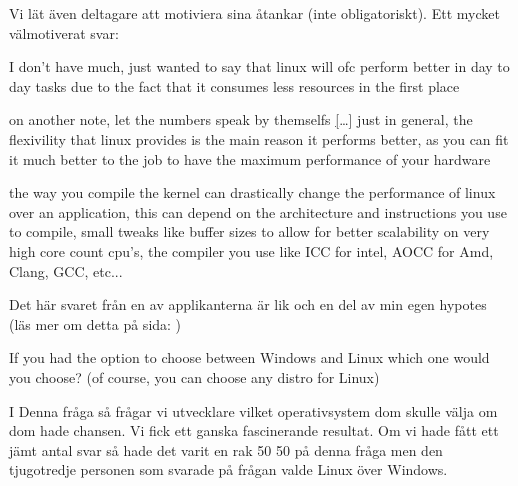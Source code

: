 \documentclass[12pt, a4paper]{report}
\begin{document}
    \vspace{.5cm}
    Vi lät även deltagare att motiviera sina åtankar (inte obligatoriskt). Ett mycket välmotiverat svar: \begin{displayquote}I don't have much, just wanted to say that linux will ofc perform better in day to day tasks due to the fact that it consumes less resources in the first place

    on another note, let the numbers speak by themselfs \hyperlink{https://www.phoronix.com/scan.php?page=article&item=win10-debian101-intel} [\dots] just in general, the flexivility that linux provides is the main reason it performs better, as you can fit it much better to the job to have the maximum performance of your hardware

    the way you compile the kernel can drastically change the performance of linux over an application, this can depend on the architecture and instructions you use to compile, small tweaks like buffer sizes to allow for better scalability on very high core count cpu's, the compiler you use like ICC for intel, AOCC for Amd, Clang, GCC, etc...
    \end{displayquote}

Det här svaret från en av applikanterna är lik och en del av min egen hypotes (läs mer om detta på sida: \pageref{slutsatts})


   \vspace{3cm}
 
   \large{If you had the option to choose between Windows and Linux which one would you choose? (of course, you can choose any distro for Linux)}
  
   \vspace{.5cm}
  
   \normalsize I Denna fråga så frågar vi utvecklare vilket operativsystem dom skulle välja om dom hade chansen. Vi fick ett ganska fascinerande resultat. Om vi hade fått ett jämt antal svar så hade det varit en rak 50 50 på denna fråga men den tjugotredje personen som svarade på frågan valde Linux över Windows.
 
   \vspace{1cm}
 
 
   \cite{form}
 
\end{document}
